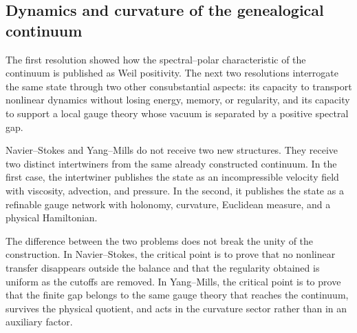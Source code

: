 \subsection{Dynamics and curvature of the genealogical continuum}
The first resolution showed how the spectral--polar characteristic of the continuum is published as Weil positivity. The next two resolutions interrogate the same state through two other consubstantial aspects: its capacity to transport nonlinear dynamics without losing energy, memory, or regularity, and its capacity to support a local gauge theory whose vacuum is separated by a positive spectral gap.\par
Navier–Stokes and Yang–Mills do not receive two new structures. They receive two distinct intertwiners from the same already constructed continuum. In the first case, the intertwiner publishes the state as an incompressible velocity field with viscosity, advection, and pressure. In the second, it publishes the state as a refinable gauge network with holonomy, curvature, Euclidean measure, and a physical Hamiltonian.\par
The difference between the two problems does not break the unity of the construction. In Navier--Stokes, the critical point is to prove that no nonlinear transfer disappears outside the balance and that the regularity obtained is uniform as the cutoffs are removed. In Yang--Mills, the critical point is to prove that the finite gap belongs to the same gauge theory that reaches the continuum, survives the physical quotient, and acts in the curvature sector rather than in an auxiliary factor.\par
{}
